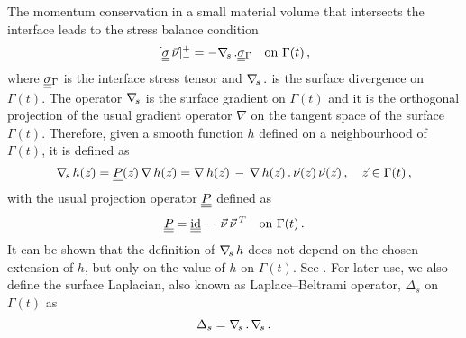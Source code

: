 The momentum conservation in a small material volume that intersects the
interface leads to the stress balance condition
\begin{equation}\label{eq:interface_jump_stress_div}
[\mat\sigma\,\vec \nu]_-^+ = -\nabs\,.\mat\sigma_{\Gamma} \quad \mbox{on }
\Gamma(t)\,,
\end{equation}
where $\mat\sigma_{\Gamma}$ is the interface stress tensor and $\nabla_{\!s}\,.$ is
the surface divergence on $\Gamma(t)$. The operator $\nabla_{\!s}$ is the surface
gradient on $\Gamma(t)$ and it is the orthogonal projection of the usual
gradient operator $\nabla$ on the tangent space of the surface $\Gamma(t)$.
Therefore, given a smooth function $h$ defined on a neighbourhood of
$\Gamma(t)$, it is defined as
\begin{equation}\label{eq:surface_gradient}
\nabs\,h(\vec z)=\mat P(\vec z)\,\nabla\,h(\vec z)=\nabla\,h(\vec z)\,-
\,\nabla\,h(\vec z)\,.\,\vec\nu(\vec z)\,\vec\nu(\vec z)\,,\quad \vec z
\in\Gamma(t)\,,
\end{equation}
with the usual projection operator $\mat P$ defined as
\begin{equation}\label{eq:surface_projection}
\mat P=\mat\id\,-\,\vec\nu\,\vec\nu\,^T\quad \mbox{on } \Gamma(t)\,.
\end{equation}
It can be shown that the definition of $\nabla_{\!s}\,h$ does not depend on the chosen
extension of $h$, but only on the value of $h$ on $\Gamma(t)$. See
\cite[\S~2.1]{DeckelnickDE05}. For later use, we also define the surface
Laplacian, also known as Laplace--Beltrami operator, $\Delta_s$ on $\Gamma(t)$
as
\begin{equation}\label{eq:surface_laplacian}
\Delta_s = \nabla_{\!s}\,.\,\nabla_{\!s}\,.
\end{equation}

